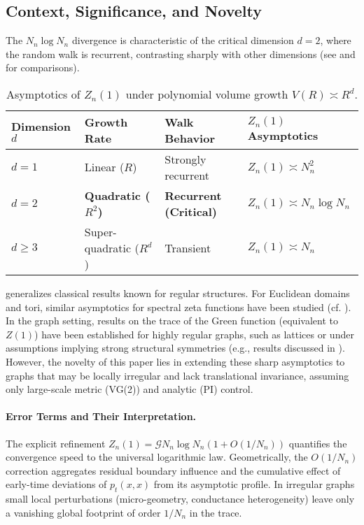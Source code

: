 \documentclass[11pt]{article}
\numberwithin{equation}{section}
\newcommand{\cG}{\mathcal{G}}
\begin{document}
\subsection{Context, Significance, and Novelty}
The $N_n \log N_n$ divergence is characteristic of the critical dimension $d=2$, where the random walk is recurrent, contrasting sharply with other dimensions (see  and  for comparisons).

\begin{table}[h!]
\centering
\caption{Asymptotics of $Z_n(1)$ under polynomial volume growth $V(R) \asymp R^d$.}
\label{tab:growth}
\begin{tabular}{@{}llll@{}}
\toprule
\textbf{Dimension} $d$ & \textbf{Growth Rate} & \textbf{Walk Behavior} & $Z_n(1)$ \textbf{Asymptotics} \\
\midrule
$d=1$ & Linear ($R$) & Strongly recurrent & $Z_n(1) \asymp N_n^2$ \\
\textbf{$d=2$} & \textbf{Quadratic ($R^2$)} & \textbf{Recurrent (Critical)} & $Z_n(1) \asymp N_n \log N_n$ \\
$d\geq 3$ & Super-quadratic ($R^d$) & Transient & $Z_n(1) \asymp N_n$ \\
\bottomrule
\end{tabular}
\end{table}

 generalizes classical results known for regular structures. For Euclidean domains and tori, similar asymptotics for spectral zeta functions have been studied (cf. \cite{Colin85, Frank10}). In the graph setting, results on the trace of the Green function (equivalent to $Z(1)$) have been established for highly regular graphs, such as lattices or under assumptions implying strong structural symmetries (e.g., results discussed in \cite{MizunoTachikawa03, Kaimanovich00}). However, the novelty of this paper lies in extending these sharp asymptotics to graphs that may be locally irregular and lack translational invariance, assuming only large-scale metric (VG(2)) and analytic (PI) control.

\paragraph{Error Terms and Their Interpretation.} The explicit refinement $Z_n(1)=\cG N_n \log N_n (1+O(1/N_n))$ quantifies the convergence speed to the universal logarithmic law. Geometrically, the $O(1/N_n)$ correction aggregates residual boundary influence and the cumulative effect of early-time deviations of $p_t(x,x)$ from its asymptotic profile. In irregular graphs small local perturbations (micro-geometry, conductance heterogeneity) leave only a vanishing global footprint of order $1/N_n$ in the trace.
\end{document}
